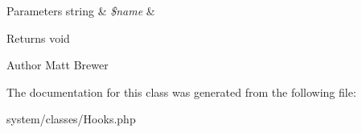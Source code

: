 \begin{DoxyParams}[1]{Parameters}
string & {\em \$name} & \\
\hline
\end{DoxyParams}
\begin{DoxyReturn}{Returns}
void 
\end{DoxyReturn}
\begin{DoxyAuthor}{Author}
Matt Brewer 
\end{DoxyAuthor}


The documentation for this class was generated from the following file:\begin{DoxyCompactItemize}
\item 
system/classes/Hooks.php\end{DoxyCompactItemize}
